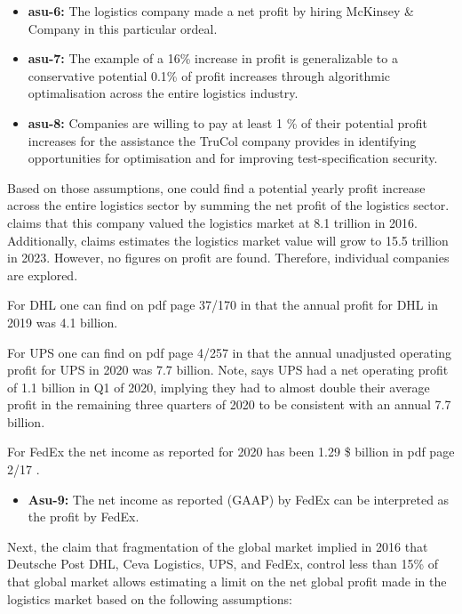  \begin{itemize}
 	\item \textbf{asu-6:} The logistics company made a net profit by hiring McKinsey \& Company in this particular ordeal.
	\item \textbf{asu-7:} The example of a 16\% increase in profit is generalizable to a conservative potential 0.1\% of profit increases through algorithmic optimalisation across the entire logistics industry.
	\item \textbf{asu-8:} Companies are willing to pay at least 1 \% of their potential profit increases for the assistance the TruCol company provides in identifying opportunities for optimisation and for improving test-specification security.
\end{itemize}

Based on those assumptions, one could find a potential yearly profit increase across the entire logistics sector by summing the net profit of the logistics sector. \cite{cips} claims that this company \cite{transparency_market_research} valued the logistics market at 8.1 trillion in 2016. Additionally, \cite{cips} claims \cite{transparency_market_research} estimates the logistics market value will grow to 15.5 trillion in 2023. However, no figures on profit are found. Therefore, individual companies are explored.

For DHL one can find on pdf page 37/170 in \cite{dhl_2019_annual_report} that the annual profit for DHL in 2019 was 4.1 billion.

For UPS one can find on pdf page 4/257 in \cite{ups_2020_annual_report} that the annual unadjusted operating profit for UPS in 2020 was 7.7 billion. Note, \cite{ups_q21_earnings_call} says UPS had a net operating profit of 1.1 billion in Q1 of 2020, implying they had to almost double their average profit in the remaining three quarters of 2020 to be consistent with an annual 7.7 billion.

For FedEx the net income as reported for 2020 has been 1.29 \$ billion in pdf page 2/17 \cite{fedex_2020_annual_report}.

\begin{itemize}
\item \textbf{Asu-9:} The net income as reported (GAAP) by FedEx can be interpreted as the profit by FedEx.
\end{itemize}

Next, the claim that fragmentation of the global market implied in 2016 that Deutsche Post DHL, Ceva Logistics, UPS, and FedEx, control less than 15\% of that global market allows estimating a limit on the net global profit made in the logistics market based on the following assumptions:

